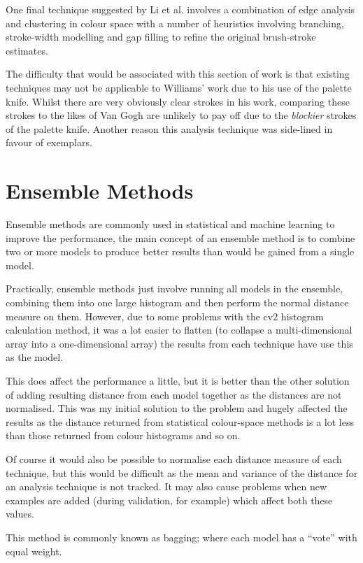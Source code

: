 One final technique suggested by Li et al.\cite{Li2012Rhythmic} involves a combination of edge
analysis and clustering in colour space with a number of heuristics involving branching, 
stroke-width modelling and gap filling to refine the original brush-stroke estimates.

The difficulty that would be associated with this section of work is that existing techniques may
not be applicable to Williams' work due to his use of the palette knife. Whilst there are very
obviously clear strokes in his work, comparing these strokes to the likes of Van Gogh are unlikely
to pay off due to the \emph{blockier} strokes of the palette knife. Another reason this analysis
technique was side-lined in favour of exemplars.


\section{Ensemble Methods}
Ensemble methods are commonly used in statistical and machine learning to improve the performance,
the main concept of an ensemble method is to combine two or more models to produce better results
than would be gained from a single model.

Practically, ensemble methods just involve running all models in the ensemble, combining them into
one large histogram and then perform the normal distance measure on them. However, due to some 
problems with the \gls{cv2} histogram calculation method, it was a lot easier to flatten
(to collapse a multi-dimensional array into a one-dimensional array) the results from each 
technique have use this as the model.

This does affect the performance a little, but it is better than the other solution of adding 
resulting distance from each model together as the distances are not normalised. This was my 
initial solution to the problem and hugely affected the results as the distance returned from
statistical colour-space methods is a lot less than those returned from colour histograms and so
on.

Of course it would also be possible to normalise each distance measure of each technique, but this
would be difficult as the mean and variance of the distance for an analysis technique is not 
tracked. It may also cause problems when new examples are added (during validation, for example)
which affect both these values.

This method is commonly known as \gls{bagging}; where each model has a ``vote'' with equal weight.

